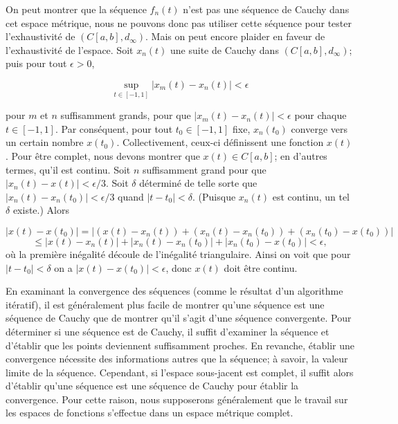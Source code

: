 \documentclass[10pt,twoside,a4paper]{book}
\begin{document}
\noindent
On peut montrer que la séquence $f_n(t)$ n'est pas une séquence de Cauchy dans cet espace métrique, nous ne pouvons donc pas utiliser cette séquence pour tester l'exhaustivité de $(C[a, b], d_\infty)$. Mais on peut encore plaider en faveur de l'exhaustivité de l'espace. 
Soit $x_n(t)$ une suite de Cauchy dans $(C[a, b], d_\infty)$; puis pour tout $\epsilon > 0$,

\begin{equation*}
  \sup_{t \in [-1, 1]} |x_m(t) - x_n(t)| < \epsilon
\end{equation*}

\noindent
pour $m$ et $n$ suffisamment grands, pour que $|x_m(t) - x_n(t)| < \epsilon$ pour chaque $t \in [-1, 1]$. Par conséquent, pour tout $t_0 \in [-1, 1]$ fixe, $x_n(t_0)$ converge vers un certain nombre $x(t_0)$. Collectivement, ceux-ci définissent une fonction $x(t)$. 
Pour être complet, nous devons montrer que $x(t) \in C[a, b]$; en d'autres termes, qu'il est continu. Soit $n$ suffisamment grand pour que $|x_n(t) - x(t)| < \epsilon/3$. Soit $\delta$ déterminé de telle sorte que $|x_n(t) - x_n(t_0)| < \epsilon/3$ quand $|t - t_0| < \delta$. (Puisque $x_n(t)$ est continu, un tel $\delta$ existe.) Alors

\begin{equation*}
  |x(t) - x(t_0)| = |(x(t) - x_n(t)) + (x_n(t) - x_n(t_0)) + (x_n(t_0) - x(t_0))|
\end{equation*}
\begin{equation*}
  \leq |x(t) - x_n(t)| + |x_n(t) - x_n(t_0)| + |x_n(t_0) - x(t_0)| < \epsilon,
\end{equation*}
\noindent
où la première inégalité découle de l'inégalité triangulaire. Ainsi on voit que pour $|t - t_0| < \delta$ on a $|x(t) - x(t_0)| < \epsilon$, donc $x(t)$ doit être continu.
\vspace{2mm}

En examinant la convergence des séquences (comme le résultat d'un algorithme itératif), il est généralement plus facile de montrer qu'une séquence est une séquence de Cauchy que de montrer qu'il s'agit d'une séquence convergente. 
Pour déterminer si une séquence est de Cauchy, il suffit d'examiner la séquence et d'établir que les points deviennent suffisamment proches. En revanche, établir une convergence nécessite des informations autres que la séquence; 
à savoir, la valeur limite de la séquence. Cependant, si l'espace sous-jacent est complet, il suffit alors d'établir qu'une séquence est une séquence de Cauchy pour établir la convergence. Pour cette raison, nous supposerons 
généralement que le travail sur les espaces de fonctions s'effectue dans un espace métrique complet.
\end{document}
